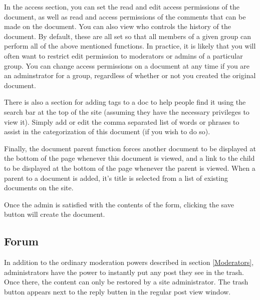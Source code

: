 \documentclass[10pt]{article}
\begin{document}
\begin{flushleft}
In the access section, you can set the read and edit access permissions of the document, as well as read and access permissions of the comments that can be made on the document. You can also view who controls the history of the document.  By default, these are all set so that all members of a given group can perform all of the above mentioned functions.  In practice, it is likely that you will often want to restrict edit permission to moderators or admins of a particular group.  You can change access permissions on a document at any time if you are an adminstrator for a group, regardless of whether or not you created the original document. 
\end{flushleft}

\begin{flushleft}
There is also a section for adding tags to a doc to help people find it using the search bar at the top of the site (assuming they have the necessary privileges to view it).  Simply add or edit the comma separated list of words or phrases to assist in the categorization of this document (if you wish to do so).
\end{flushleft}

\begin{flushleft}
Finally, the document parent function forces another document to be displayed at the bottom of the page whenever this document is viewed, and a link to the child to be displayed at the bottom of the page whenever the parent is viewed.  When a parent to a document is added, it's title is selected from a list of existing documents on the site.
\end{flushleft}

\begin{flushleft}
Once the admin is satisfied with the contents of the form, clicking the save button will create the document. 
\end{flushleft}

\subsection{Forum}
\begin{flushleft}
In addition to the ordinary moderation powers described in section \ref{Moderators}, administrators have the power to instantly put any post they see in the trash.  Once there, the content can only be restored by a site administrator. The trash button appears next to the reply butten in the regular post view window.
\end{flushleft}
\end{document}
